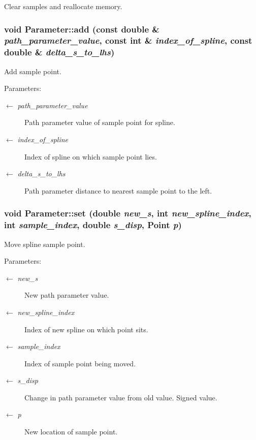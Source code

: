 Clear samples and reallocate memory. \hypertarget{classParameter_baa819bda68eaca98d6d78bde5c65f1b}{
\subsubsection[add]{\setlength{\rightskip}{0pt plus 5cm}void Parameter::add (const double \& {\em path\_\-parameter\_\-value}, \/  const int \& {\em index\_\-of\_\-spline}, \/  const double \& {\em delta\_\-s\_\-to\_\-lhs})}}
\label{classParameter_baa819bda68eaca98d6d78bde5c65f1b}


Add sample point. \begin{Desc}
\item[Parameters:]
\begin{description}
\item[\mbox{$\leftarrow$} {\em path\_\-parameter\_\-value}]Path parameter value of sample point for spline. \item[\mbox{$\leftarrow$} {\em index\_\-of\_\-spline}]Index of spline on which sample point lies. \item[\mbox{$\leftarrow$} {\em delta\_\-s\_\-to\_\-lhs}]Path parameter distance to nearest sample point to the left. \end{description}
\end{Desc}
\hypertarget{classParameter_d0a92d44cf3746bfae006c5761b862d1}{
\subsubsection[set]{\setlength{\rightskip}{0pt plus 5cm}void Parameter::set (double {\em new\_\-s}, \/  int {\em new\_\-spline\_\-index}, \/  int {\em sample\_\-index}, \/  double {\em s\_\-disp}, \/  {\bf Point} {\em p})}}
\label{classParameter_d0a92d44cf3746bfae006c5761b862d1}


Move spline sample point. \begin{Desc}
\item[Parameters:]
\begin{description}
\item[\mbox{$\leftarrow$} {\em new\_\-s}]New path parameter value. \item[\mbox{$\leftarrow$} {\em new\_\-spline\_\-index}]Index of new spline on which point sits. \item[\mbox{$\leftarrow$} {\em sample\_\-index}]Index of sample point being moved. \item[\mbox{$\leftarrow$} {\em s\_\-disp}]Change in path parameter value from old value. Signed value. \item[\mbox{$\leftarrow$} {\em p}]New location of sample point. \end{description}
\end{Desc}


